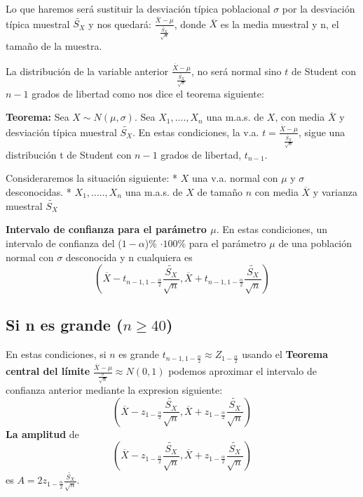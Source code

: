 \documentclass[
]{article}
\begin{document}
Lo que haremos será sustituir la desviación típica poblacional
\(\sigma\) por la desviación típica muestral \(\tilde{S_X}\) y nos
quedará: \(\frac{\overline{X}-\mu}{\frac{\tilde{S_X}}{\sqrt{n}}}\),
donde \(\overline{X}\) es la media muestral y n, el tamaño de la
muestra.

La distribución de la variable anterior
\(\frac{\overline{X}-\mu}{\frac{\tilde{S_X}}{\sqrt{n}}}\), no será
normal sino \(t\) de Student con \(n-1\) grados de libertad como nos
dice el teorema siguiente:

\textbf{Teorema:} Sea \(X \sim N(\mu, \sigma)\). Sea \(X_1,....,X_n\)
una m.a.s. de \(X\), con media \(\overline{X}\) y desviación típica
muestral \(\tilde{S_X}\). En estas condiciones, la v.a.
\(t = \frac{\overline{X}-\mu}{\frac{\tilde{S_X}}{\sqrt{n}}}\), sigue una
distribución t de Student con \(n-1\) grados de libertad, \(t_{n-1}\).

Consideraremos la situación siguiente: * \(X\) una v.a. normal con
\(\mu\) y \(\sigma\) desconocidas. * \(X_1,.....,X_n\) una m.a.s. de
\(X\) de tamaño \(n\) con media \(\overline{X}\) y varianza muestral
\(\tilde{S_X}\)

\textbf{Intervalo de confianza para el parámetro \(\mu\)}. En estas
condiciones, un intervalo de confianza del (\(1-\alpha\))\%
\(\cdot 100\)\% para el parámetro \(\mu\) de una población normal con
\(\sigma\) desconocida y n cualquiera es
\[(\overline{X}-t_{n-1,1-\frac{\alpha}{2}}\frac{\tilde{S_X}}{\sqrt{n}},\overline{X}+t_{n-1,1-\frac{\alpha}{2}}\frac{\tilde{S_X}}{\sqrt{n}})\]

\hypertarget{si-n-es-grande-n-geq-40}{%
\subsection{\texorpdfstring{Si n es grande
(\(n \geq 40\))}{Si n es grande (n \textbackslash geq 40)}}\label{si-n-es-grande-n-geq-40}}

En estas condiciones, si \(n\) es grande
\(t_{n-1,1-\frac{\alpha}{2}} \approx Z_{1-\frac{\alpha}{2}}\) usando el
\textbf{Teorema central del límite}
\(\frac{\overline{X}-{\mu}}{\frac{\sigma}{\sqrt{n}}} \approx N(0,1)\)
podemos aproximar el intervalo de confianza anterior mediante la
expresion siguiente:
\[(\overline{X}-z_{1-\frac{\alpha}{2}}\frac{\tilde{S_X}}{\sqrt{n}},\overline{X}+z_{1-\frac{\alpha}{2}}\frac{\tilde{S_X}}{\sqrt{n}})\]
\textbf{La amplitud} de
\[(\overline{X}-z_{1-\frac{\alpha}{2}}\frac{\tilde{S_X}}{\sqrt{n}},\overline{X}+z_{1-\frac{\alpha}{2}}\frac{\tilde{S_X}}{\sqrt{n}})\]
es \(A = 2z_{1-\frac{\alpha}{2}}\frac{\tilde{S_X}}{\sqrt{n}}\).
\end{document}
